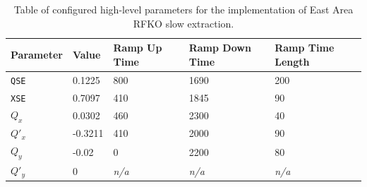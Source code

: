 \documentclass[11pt]{report}
\begin{document}
\begin{center}
  \centering
  \begin{table}[]
    \centering
    \begin{tabular}{lllll}
    Parameter & Value   & Ramp Up Time & Ramp Down Time & Ramp Time Length \\ \hline\hline
    \verb|QSE|& 0.1225  & 800          & 1690           & 200              \\
    \verb|XSE|& 0.7097  & 410          & 1845           & 90               \\
    $Q_x$     & 0.0302  & 460          & 2300           & 40               \\
    $Q'_x$    & -0.3211 & 410          & 2000           & 90               \\
    $Q_y$     & -0.02   & 0            & 2200           & 80               \\
    $Q'_y$    & 0       & \textit{n/a} & \textit{n/a}   & \textit{n/a}     \\
    \end{tabular}
    \caption{Table of configured high-level parameters for the implementation of East Area RFKO slow extraction.}\label{tab:params}
    \end{table}
\end{center}
\end{document}
